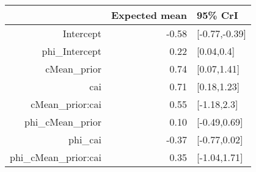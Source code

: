 \begin{tabular}{rrl}
  \hline
 & Expected mean & 95\% CrI \\ 
  \hline
Intercept & -0.58 & [-0.77,-0.39] \\ 
  phi\_Intercept & 0.22 & [0.04,0.4] \\ 
  cMean\_prior & 0.74 & [0.07,1.41] \\ 
  cai & 0.71 & [0.18,1.23] \\ 
  cMean\_prior:cai & 0.55 & [-1.18,2.3] \\ 
  phi\_cMean\_prior & 0.10 & [-0.49,0.69] \\ 
  phi\_cai & -0.37 & [-0.77,0.02] \\ 
  phi\_cMean\_prior:cai & 0.35 & [-1.04,1.71] \\ 
   \hline
\end{tabular}

